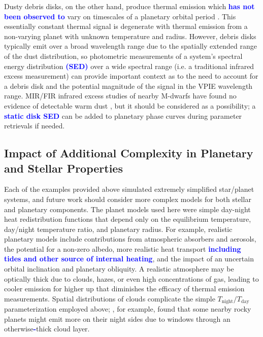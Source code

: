 \documentclass[twocolumn,linenumbers]{aastex7}
\newcommand{\update}[1]{\textcolor{blue}{\bf #1}}
\begin{document}
Dusty debris disks, on the other hand, produce thermal emission which \update{has not been observed to} vary on timescales of a planetary orbital period \citep[e.g.,][]{balog2009,hughes2018}. This essentially constant thermal signal is degenerate with thermal emission from a non-varying planet with unknown temperature and radius. However, debris disks typically emit over a broad wavelength range due to the spatially extended range of the dust distribution, so photometric measurements of a system's spectral energy distribution \update{(SED)} over a wide spectral range (i.e. a traditional infrared excess measurement) can provide important context as to the need to account for a debris disk and the potential magnitude of the signal in the VPIE wavelength range. MIR/FIR infrared excess studies of nearby M-dwarfs have found no evidence of detectable warm dust \citep{gautieriii2007}, but it should be considered as a possibility; a \update{static disk SED} can be added to planetary phase curves during parameter retrievals if needed.


\subsection{Impact of Additional Complexity in Planetary and Stellar Properties}
Each of the examples provided above simulated extremely simplified star/planet systems, and future work should consider more complex models for both stellar and planetary components. The planet models used here were simple day-night heat redistribution functions that depend only on the equilibrium temperature, day/night temperature ratio, and planetary radius. For example, realistic planetary models include contributions from atmospheric absorbers and aerosols, the potential for a non-zero albedo, more realistic heat transport \update{including tides and other source of internal heating}, and the impact of an uncertain orbital inclination and planetary obliquity. A realistic atmosphere may be optically thick due to clouds, hazes, or even high concentrations of gas, leading to cooler emission for higher up that diminishes the efficacy of thermal emission measurements. Spatial distributions of clouds complicate the simple $T_\mathrm{night}/T_\mathrm{day}$ parameterization employed above; \citet{hammond2025}, for example, found that some nearby rocky planets might emit more on their night sides due to windows through an otherwise\update{-}thick cloud layer.
\end{document}
